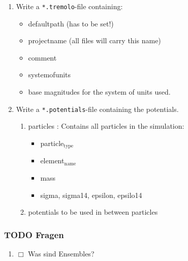 \documentclass[11pt]{article}
\begin{document}
\begin{itemize}
\begin{itemize}
\begin{enumerate}
\item Write a \texttt{*.tremolo}-file containing:

\begin{itemize}
\item defaultpath (has to be set!)
\item projectname (all files will carry this name)
\item comment
\item systemofunits
\item base magnitudes for the system of units used.
\end{itemize}

\item Write a \texttt{*.potentials}-file containing the potentials.

\begin{enumerate}
\item particles : Contains all particles in the simulation:

\begin{itemize}
\item particle$_{\mathrm{type}}$
\item element$_{\mathrm{name}}$
\item mass
\item sigma, sigma14, epsilon, epsilo14
\end{itemize}

\item potentials to be used in between particles
\end{enumerate}

\end{enumerate}
\end{itemize} %
\end{itemize} %
\subsubsection{\textbf{TODO} Fragen}
\label{sec-4.1.3}


\begin{enumerate}
\item $\Box$ Was sind Ensembles?
\end{enumerate}
\end{document}
